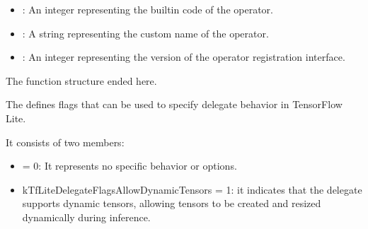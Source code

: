 \begin{center}
    \label{Figure:Comatibily}
\end{center}

\begin{itemize}
    \item {}: An integer representing the builtin code of the operator.
\end{itemize}


\begin{center}
    \label{Figure:Comatibily}
\end{center}

\begin{itemize}
    \item {}: A string representing the custom name of the operator.
    \item {}: An integer representing the version of the operator registration interface. 
\end{itemize}

The function structure ended here. 

\begin{center}
    \label{Figure:Comatibily}
\end{center}

The  defines flags that can be used to specify delegate behavior in TensorFlow Lite.

\begin{center}
    \label{Figure:Comatibily}
\end{center}

It consists of two members:
\begin{itemize}
    \item  {} = 0: It represents no specific behavior or options.
    \item{kTfLiteDelegateFlagsAllowDynamicTensors} = 1: it indicates that the delegate supports dynamic tensors, allowing tensors to be created and resized dynamically during inference.
\end{itemize}

